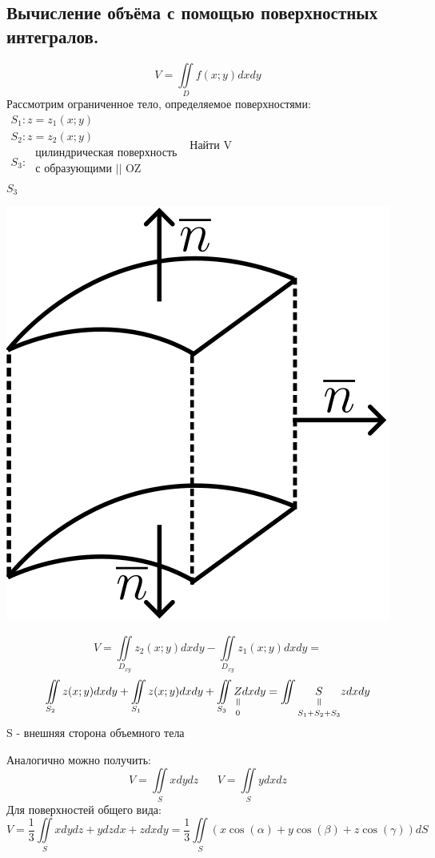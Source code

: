 \documentclass[12pt]{article}
\let\ORIincludegraphics\includegraphics
\renewcommand{\includegraphics}[2][]{\ORIincludegraphics[scale=0.65,#1]{#2}}
\newcommand{\verteq}{\rotatebox{90}{$\,=$}}
\newcommand{\equalto}[2]{\underset{\scriptstyle\overset{\mkern4mu\verteq}{#2}}{#1}}
\let\oldiint\iint
\renewcommand{\iint}{\oldiint\limits}
\begin{document}
  \subsection{Вычисление объёма с помощью поверхностных интегралов.}
  \[V = \iint_D f(x;y)dxdy\]
  Рассмотрим ограниченное тело, определяемое поверхностями: $\begin{matrix}
    S_1: z=z_1(x;y)\\
    S_2: z=z_2(x;y)\\
    S_3: \begin{matrix}
      \text{ цилиндрическая поверхность}\\
      \text{ с образующими || OZ}
    \end{matrix}
  \end{matrix}$
  Найти V\\
  $S_3$\hspace{5pt}\begin{minipage}{0.3\textwidth}
    \includegraphics[scale=0.6]{8.22.1.png}
  \end{minipage}
  \hspace{1em}
  \begin{minipage}{0.55\textwidth}
    \[V=\iint_{D_{xy}}z_2(x;y)dxdy -\iint_{D_{xy}}z_1(x;y)dxdy=\]
    \[\iint_{S_2}z(x;y)dxdy+\iint_{S_1}z(x;y)dxdy+\iint_{S_3}\equalto{Z}{0}dxdy=\iint{\equalto{S}{S_1+S_2+S_3}}z dxdy\]
    S - внешняя сторона объемного тела
  \end{minipage}
  \vspace{1em}
  \par
  Аналогично можно получить: \[ V=\iint_S x dydz \hspace{20pt} V=\iint_S y dxdz\]
  Для поверхностей общего вида: \[V = \frac{1}{3}\iint_S xdydz+ydzdx+zdxdy=\frac{1}{3}\iint_S(x\cos(\alpha)+y\cos(\beta)+z\cos(\gamma))dS\]
\end{document}
